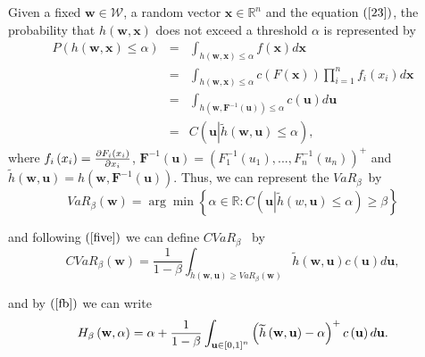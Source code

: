 \documentclass[a4paper,12pt]{report}
\begin{document}
Given a fixed $\mathbf{w\in }\mathcal{W}$, a random vector $\mathbf{x\in
	\mathbb{R}
}^{n}$ and the equation $\left( \ref{23}\right) $, the probability that $%
h\left( \mathbf{w,x}\right) $ does not exceed a threshold $\alpha $ is
represented by
\begin{eqnarray*}
	P\left( h\left( \mathbf{w,x}\right) \leq \alpha \right)  &=&\int_{h\left(
		\mathbf{w,x}\right) \leq \alpha }f\left( \mathbf{x}\right) d\mathbf{x} \\
	&=&\int_{h\left( \mathbf{w,x}\right) \leq \alpha }c\left( F\left( \mathbf{x}%
	\right) \right) \prod_{i=1}^{n}f_{i}\left( x_{i}\right) d\mathbf{x} \\
	&=&\int_{h\left( \mathbf{w,F}^{-1}\left( \mathbf{u}\right) \right) \leq
		\alpha }c\left( \mathbf{u}\right) d\mathbf{u} \\
	&=&C\left( \mathbf{u}\left\vert \widetilde{h}\left( \mathbf{w,u}\right) \leq
	\alpha \right. \right) ,
\end{eqnarray*}%
where $f_{i}\left( x_{i}\right) =\frac{\partial F_{i}\left( x_{i}\right) }{%
	\partial x_{i}}$, $\mathbf{F}^{-1}\left( \mathbf{u}\right) =\left(
F_{1}^{-1}\left( u_{1}\right) ,...,F_{n}^{-1}\left( u_{n}\right) \right) ^{+}
$ and $\widetilde{h}\left( \mathbf{w,u}\right) =h\left( \mathbf{w,F}%
^{-1}\left( \mathbf{u}\right) \right) .$ Thus, we can represent the $VaR_{\beta }$\thinspace\ by
\begin{equation}
VaR_{\beta }\left( \mathbf{w}\right) =\arg \min \left\{ \alpha \in
\mathbb{R}
:C\left( \mathbf{u}\left\vert \widetilde{h}\left( w\mathbf{,u}\right) \leq \alpha
\right. \right) \geq \beta \right\}  \label{25}
\end{equation}

and following $\left( \ref{five}\right) $ we can define $CVaR_{\beta }$%
\thinspace\ by%
\begin{equation}
CVaR_{\beta }\left( \mathbf{w}\right) =\frac{1}{1-\beta }\int_{\widetilde{h}\left(
	\mathbf{w,u}\right) \geq VaR_{\beta }\left( \mathbf{w}\right) }\widetilde{h}\left(
\mathbf{w,u}\right) c\left( \mathbf{u}\right) d\mathbf{u,}  \label{26}
\end{equation}

and by $\left( \ref{fb}\right) $ we can write
\begin{equation}
H_{\beta }\left( \mathbf{w},\alpha \right) =\alpha +\frac{1}{1-\beta }\int_{%
	\mathbf{u} \in \left[ 0,1\right] ^{n}}\left( \widetilde{h}\left( \mathbf{w,u}\right)
-\alpha \right) ^{+}c\left( \mathbf{u}\right) d\mathbf{u.}  \label{27}
\end{equation}
\end{document}
